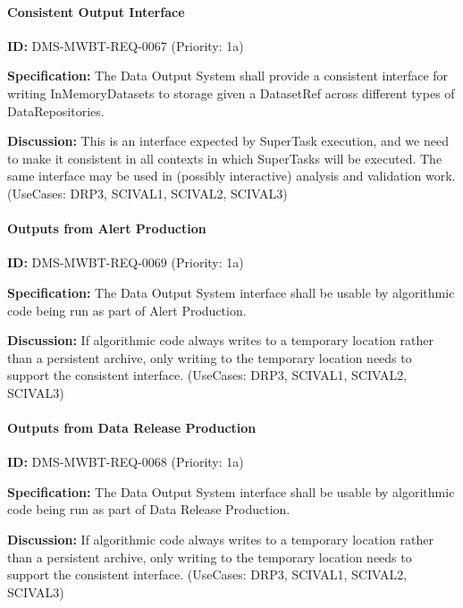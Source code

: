 \documentclass[SE,toc,lsstdraft]{lsstdoc}
\begin{document}
\paragraph{Consistent Output Interface}\hfill  %

\label{DMS-MWBT-REQ-0067}
\textbf{ID:} DMS-MWBT-REQ-0067 (Priority: 1a)

\textbf{Specification:}
The Data Output System shall provide a consistent interface for writing InMemoryDatasets to storage given a DatasetRef across different types of DataRepositories.

\textbf{Discussion:}
This is an interface expected by SuperTask execution, and we need to make it consistent in all contexts in which SuperTasks will be executed. The same interface may be used in (possibly interactive) analysis and validation work. (UseCases: DRP3, SCIVAL1, SCIVAL2, SCIVAL3)

\paragraph{Outputs from Alert Production}\hfill  %

\label{DMS-MWBT-REQ-0069}
\textbf{ID:} DMS-MWBT-REQ-0069 (Priority: 1a)

\textbf{Specification:}
The Data Output System interface shall be usable by algorithmic code being run as part of Alert Production.

\textbf{Discussion:}
If algorithmic code always writes to a temporary location rather than a persistent archive, only writing to the temporary location needs to support the consistent interface. (UseCases: DRP3, SCIVAL1, SCIVAL2, SCIVAL3)

\paragraph{Outputs from Data Release Production}\hfill  %

\label{DMS-MWBT-REQ-0068}
\textbf{ID:} DMS-MWBT-REQ-0068 (Priority: 1a)

\textbf{Specification:}
The Data Output System interface shall be usable by algorithmic code being run as part of Data Release Production.

\textbf{Discussion:}
If algorithmic code always writes to a temporary location rather than a persistent archive, only writing to the temporary location needs to support the consistent interface. (UseCases: DRP3, SCIVAL1, SCIVAL2, SCIVAL3)
\end{document}
